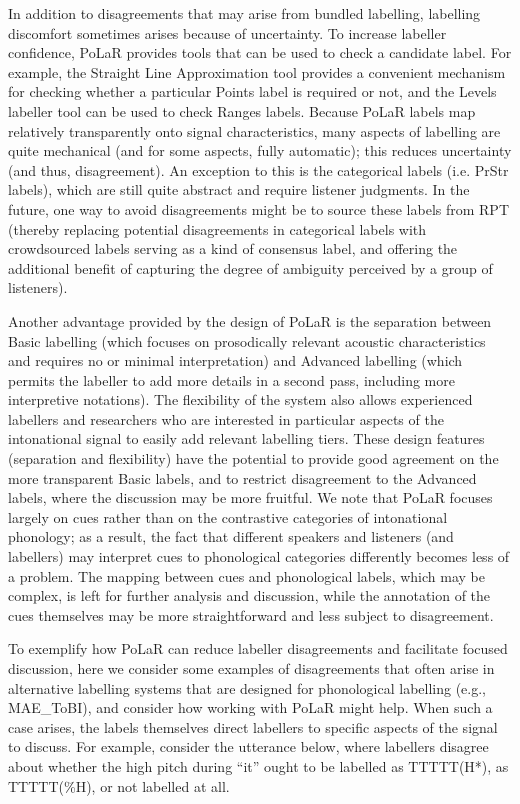 \documentclass[11pt, twoside]{memoir}
\begin{document}
In addition to disagreements that may arise from bundled labelling, labelling discomfort sometimes arises because of uncertainty.  To increase labeller confidence, PoLaR provides tools that can be used to check a candidate label.  For example, the Straight Line Approximation tool provides a convenient mechanism for checking whether a particular Points label is required or not, and the Levels labeller tool can be used to check Ranges labels.  Because PoLaR labels map relatively transparently onto signal characteristics, many aspects of labelling are quite mechanical (and for some aspects, fully automatic); this reduces uncertainty (and thus, disagreement). An exception to this is the categorical labels (i.e. PrStr labels), which are still quite abstract and require listener judgments. In the future, one way to avoid disagreements might be to source these labels from RPT (thereby replacing potential disagreements in categorical labels with crowdsourced labels serving as a kind of consensus label, and offering the additional benefit of capturing the degree of ambiguity perceived by a group of listeners). 

Another advantage provided by the design of PoLaR is the separation between Basic labelling (which focuses on prosodically relevant acoustic characteristics and requires no or minimal interpretation) and Advanced labelling (which permits the labeller to add more details in a second pass, including more interpretive notations). The flexibility of the system also allows experienced labellers and researchers who are interested in particular aspects of the intonational signal to easily add relevant labelling tiers.  These design features (separation and flexibility) have the potential to provide good agreement on the more transparent Basic labels, and to restrict disagreement to the Advanced labels, where the discussion may be more fruitful.  We note that PoLaR focuses largely on cues rather than on the contrastive categories of intonational phonology; as a result, the fact that different speakers and listeners (and labellers) may interpret cues to phonological categories differently becomes less of a problem.  The mapping between cues and phonological labels, which may be complex, is left for further analysis and discussion, while the annotation of the cues themselves may be more straightforward and less subject to disagreement.

To exemplify how PoLaR can reduce labeller disagreements and facilitate focused discussion, here we consider some examples of disagreements that often arise in alternative labelling systems that are designed for phonological labelling (e.g., MAE\_ToBI), and consider how working with PoLaR might help. When such a case arises, the labels themselves direct labellers to specific aspects of the signal to discuss. For example, consider the utterance below, where labellers disagree about whether the high pitch during “it” ought to be labelled as TTTTT(H*), as TTTTT(\%H), or not labelled at all.
\end{document}
